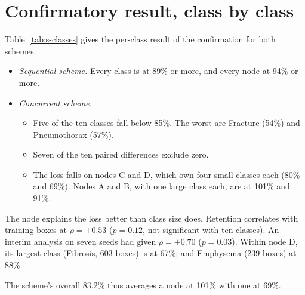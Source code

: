 \documentclass[pdflatex,sn-mathphys-num]{sn-jnl}
\begin{document}
\section{Confirmatory result, class by class}\label{sec:s-confirm}

Table~\ref{tab:s-classes} gives the per-class result of the confirmation for both schemes.
\begin{itemize}
\item \emph{Sequential scheme.} Every class is at 89\% or more, and every node at 94\% or more.
\item \emph{Concurrent scheme.}
  \begin{itemize}
  \item Five of the ten classes fall below 85\%. The worst are Fracture (54\%) and Pneumothorax (57\%).
  \item Seven of the ten paired differences exclude zero.
  \item The loss falls on nodes C and D, which own four small classes each (80\% and 69\%). Nodes A and B, with one large class each, are at 101\% and 91\%.
  \end{itemize}
\end{itemize}
The node explains the loss better than class size does. Retention correlates with training boxes at $\rho=+0.53$ ($p=0.12$, not significant with ten classes). An interim analysis on seven seeds had given $\rho=+0.70$ ($p=0.03$). Within node D, its largest class (Fibrosis, 603 boxes) is at 67\%, and Emphysema (239 boxes) at 88\%.

The scheme's overall 83.2\% thus averages a node at 101\% with one at 69\%.
\end{document}
